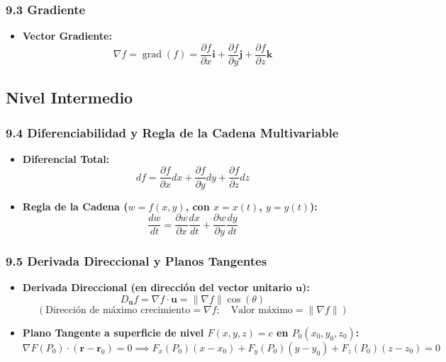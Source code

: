 \documentclass[11pt,a4paper]{article}
\begin{document}
\subsubsection*{9.3 Gradiente}

\begin{itemize}
  \item \textbf{Vector Gradiente:}
  \[
    \nabla f = \operatorname{grad}(f) = \frac{\partial f}{\partial x}\mathbf{i} + \frac{\partial f}{\partial y}\mathbf{j} + \frac{\partial f}{\partial z}\mathbf{k}
  \]
\end{itemize}

\subsection*{Nivel Intermedio}

\subsubsection*{9.4 Diferenciabilidad y Regla de la Cadena Multivariable}

\begin{itemize}
  \item \textbf{Diferencial Total:}
  \[
    df = \frac{\partial f}{\partial x} dx + \frac{\partial f}{\partial y} dy + \frac{\partial f}{\partial z} dz
  \]
  \item \textbf{Regla de la Cadena ($w = f(x, y)$, con $x = x(t)$, $y = y(t)$):}
  \[
    \frac{dw}{dt} = \frac{\partial w}{\partial x}\frac{dx}{dt} + \frac{\partial w}{\partial y}\frac{dy}{dt}
  \]
\end{itemize}

\subsubsection*{9.5 Derivada Direccional y Planos Tangentes}

\begin{itemize}
  \item \textbf{Derivada Direccional (en dirección del vector unitario $\mathbf{u}$):}
  \[
    D_{\mathbf{u}} f = \nabla f \cdot \mathbf{u} = \|\nabla f\|\cos(\theta)
  \]
  \[
    (\text{Dirección de máximo crecimiento} = \nabla f; \quad \text{Valor máximo} = \|\nabla f\|)
  \]
  \item \textbf{Plano Tangente a superficie de nivel $F(x, y, z) = c$ en $P_0(x_0, y_0, z_0)$:}
  \[
    \nabla F(P_0) \cdot (\mathbf{r} - \mathbf{r}_0) = 0 \implies F_x(P_0)(x - x_0) + F_y(P_0)(y - y_0) + F_z(P_0)(z - z_0) = 0
  \]
\end{itemize}
\end{document}

